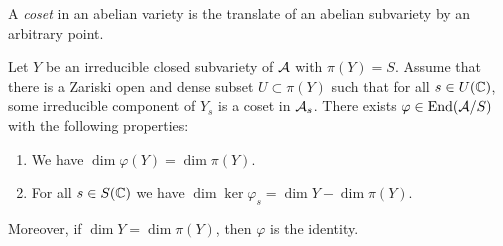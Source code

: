 \documentclass[12pt,oneside]{amsart}
\begin{document}
A \emph{coset} in an abelian variety is the translate of an abelian
subvariety by an arbitrary point. 

\begin{lemma}
  \label{lem:abschquot}
  Let $Y$ be an irreducible closed subvariety of $\mathcal{A}$ with $\pi(Y)=S$. %
  Assume that there is a Zariski open and dense subset $U\subset
  \pi(Y)$ such that for all $s\in U({\mathbb{C}})$,
  some irreducible component of  $Y_s$ is a coset in
  $\mathcal{A}_s$.
  There exists $\varphi\in \mathrm{End}(\mathcal{A}/S)$
  with the following properties:
  \begin{enumerate}
  \item [(i)] We have   $\dim \varphi(Y) = \dim \pi(Y)$.
  \item[(ii)] %
    For all $s\in S({\mathbb{C}})$ we have $\dim\ker \varphi_s = \dim Y - \dim\pi(Y)$.
  \end{enumerate}
  Moreover, if $\dim Y = \dim \pi(Y)$, then $\varphi$ is the identity.
\end{lemma}
\end{document}
